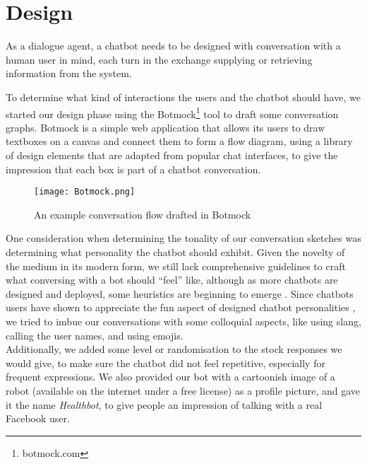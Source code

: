 \section{Design}
As a dialogue agent, a chatbot needs to be designed with conversation with a human user in mind, each turn in the exchange supplying or retrieving information from the system.

To determine what kind of interactions the users and the chatbot should have, we started our design phase using the Botmock\footnote{botmock.com} tool to draft some conversation graphs. Botmock is a simple web application that allows its users to draw textboxes on a canvas and connect them to form a flow diagram, using a library of design elements that are adapted from popular chat interfaces, to give the impression that each box is part of a chatbot conversation.

\begin{figure}[h!]
  \texttt{[image: Botmock.png]}
  \caption{An example conversation flow drafted in Botmock}
\end{figure}
One consideration when determining the tonality of our conversation sketches was determining what personality the chatbot should exhibit. Given the novelty of the medium in its modern form, we still lack comprehensive guidelines to craft what conversing with a bot should ``feel'' like, although as more chatbots are designed and deployed, some heuristics are beginning to emerge \cite{jessie}. Since chatbots users have shown to appreciate the fun aspect of designed chatbot personalities \cite{10.1007/978-3-319-67744-6_28}, we tried to imbue our conversations with some colloquial aspects, like using slang, calling the user names, and using emojis. \\
Additionally, we added some level or randomisation to the stock responses we would give, to make sure the chatbot did not feel repetitive, especially for frequent expressions. We also provided our bot with a cartoonish image of a robot (available on the internet under a free license) as a profile picture, and gave it the name \textit{Healthbot}, to give people an impression of talking with a real Facebook user.
